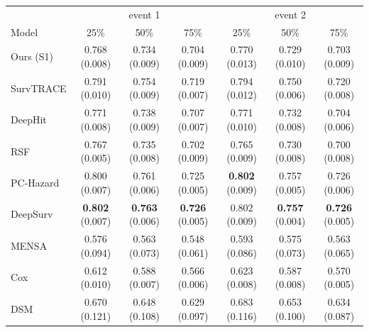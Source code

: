 \begin{tabular}{lcccccc}
\toprule
 & \multicolumn{3}{c}{event 1} & \multicolumn{3}{c}{event 2} \\
Model & 25\% & 50\% & 75\% & 25\% & 50\% & 75\% \\
\midrule
Ours (S1) & 0.768 (0.008) & 0.734 (0.009) & 0.704 (0.009) & 0.770 (0.013) & 0.729 (0.010) & 0.703 (0.009) \\
SurvTRACE & 0.791 (0.010) & 0.754 (0.009) & 0.719 (0.007) & 0.794 (0.012) & 0.750 (0.006) & 0.720 (0.008) \\
DeepHit & 0.771 (0.008) & 0.738 (0.009) & 0.707 (0.007) & 0.771 (0.010) & 0.732 (0.008) & 0.704 (0.006) \\
RSF & 0.767 (0.005) & 0.735 (0.008) & 0.702 (0.009) & 0.765 (0.009) & 0.730 (0.008) & 0.700 (0.008) \\
PC-Hazard & 0.800 (0.007) & 0.761 (0.006) & 0.725 (0.005) & \textbf{0.802} (0.009) & 0.757 (0.005) & 0.726 (0.006) \\
DeepSurv & \textbf{0.802} (0.007) & \textbf{0.763} (0.006) & \textbf{0.726} (0.005) & 0.802 (0.009) & \textbf{0.757} (0.004) & \textbf{0.726} (0.005) \\
MENSA & 0.576 (0.094) & 0.563 (0.073) & 0.548 (0.061) & 0.593 (0.086) & 0.575 (0.073) & 0.563 (0.065) \\
Cox & 0.612 (0.010) & 0.588 (0.007) & 0.566 (0.006) & 0.623 (0.008) & 0.587 (0.008) & 0.570 (0.005) \\
DSM & 0.670 (0.121) & 0.648 (0.108) & 0.629 (0.097) & 0.683 (0.116) & 0.653 (0.100) & 0.634 (0.087) \\
\bottomrule
\end{tabular}

